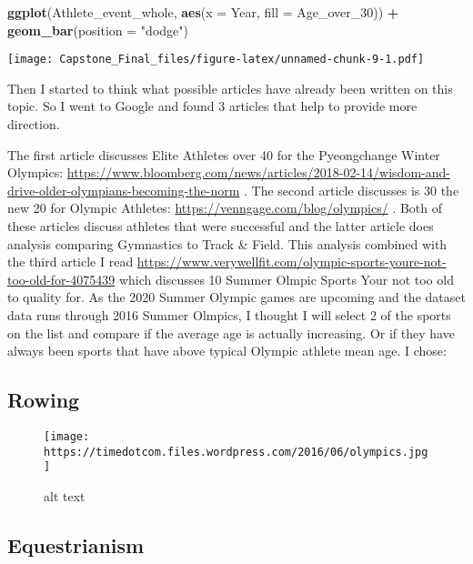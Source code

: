 \documentclass[]{article}
\newenvironment{Shaded}{\begin{snugshade}}{\end{snugshade}}
\newcommand{\KeywordTok}[1]{\textcolor[rgb]{0.13,0.29,0.53}{\textbf{#1}}}
\newcommand{\DataTypeTok}[1]{\textcolor[rgb]{0.13,0.29,0.53}{#1}}
\newcommand{\DecValTok}[1]{\textcolor[rgb]{0.00,0.00,0.81}{#1}}
\newcommand{\StringTok}[1]{\textcolor[rgb]{0.31,0.60,0.02}{#1}}
\newcommand{\OperatorTok}[1]{\textcolor[rgb]{0.81,0.36,0.00}{\textbf{#1}}}
\newcommand{\NormalTok}[1]{#1}
\begin{document}
\begin{Shaded}
\begin{Highlighting}[]
\KeywordTok{ggplot}\NormalTok{(Athlete_event_whole, }\KeywordTok{aes}\NormalTok{(}\DataTypeTok{x =}\NormalTok{ Year, }\DataTypeTok{fill =}\NormalTok{ Age_over_}\DecValTok{30}\NormalTok{)) }\OperatorTok{+}
\StringTok{  }\KeywordTok{geom_bar}\NormalTok{(}\DataTypeTok{position =} \StringTok{"dodge"}\NormalTok{)}
\end{Highlighting}
\end{Shaded}

\texttt{[image: Capstone\_Final\_files/figure-latex/unnamed-chunk-9-1.pdf]}

Then I started to think what possible articles have already been written
on this topic. So I went to Google and found 3 articles that help to
provide more direction.

The first article discusses Elite Athletes over 40 for the Pyeongchange
Winter Olympics:
\url{https://www.bloomberg.com/news/articles/2018-02-14/wisdom-and-drive-older-olympians-becoming-the-norm}
. The second article discusses is 30 the new 20 for Olympic Athletes:
\url{https://venngage.com/blog/olympics/} . Both of these articles
discuss athletes that were successful and the latter article does
analysis comparing Gymnastics to Track \& Field. This analysis combined
with the third article I read
\url{https://www.verywellfit.com/olympic-sports-youre-not-too-old-for-4075439}
which discusses 10 Summer Olmpic Sports Your not too old to quality for.
As the 2020 Summer Olympic games are upcoming and the dataset data runs
through 2016 Summer Olmpics, I thought I will select 2 of the sports on
the list and compare if the average age is actually increasing. Or if
they have always been sports that have above typical Olympic athlete
mean age. I chose:

\subsection{Rowing}\label{rowing}

\begin{figure}
\centering
\texttt{[image: https://timedotcom.files.wordpress.com/2016/06/olympics.jpg]}
\caption{alt text}
\end{figure}

\subsection{Equestrianism}\label{equestrianism}
\end{document}
